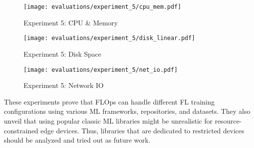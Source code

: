 \begin{figure}[p]
    \begin{adjustwidth}{-0.2\paperwidth}{-0.2\paperwidth}
        \centering
        \texttt{[image: evaluations/experiment\_5/cpu\_mem.pdf]}
        \caption{Experiment 5: CPU \& Memory}
        \label{fig:eval_5_cpu_mem}
    \end{adjustwidth}

    \begin{adjustwidth}{-0.2\paperwidth}{-0.2\paperwidth}
        \centering
        \texttt{[image: evaluations/experiment\_5/disk\_linear.pdf]}
        \caption{Experiment 5: Disk Space}
        \label{fig:eval_5_disk_space}
    \end{adjustwidth}

    \begin{adjustwidth}{-0.2\paperwidth}{-0.2\paperwidth}
        \centering
        \texttt{[image: evaluations/experiment\_5/net\_io.pdf]}
        \caption{Experiment 5: Network IO}
        \label{fig:eval_5_net_io}
    \end{adjustwidth}
\end{figure}

These experiments prove that FLOps can handle different FL training configurations using various ML frameworks, repositories, and datasets.
They also unveil that using popular classic ML libraries might be unrealistic for resource-constrained edge devices.
Thus, libraries that are dedicated to restricted devices should be analyzed and tried out as future work.

